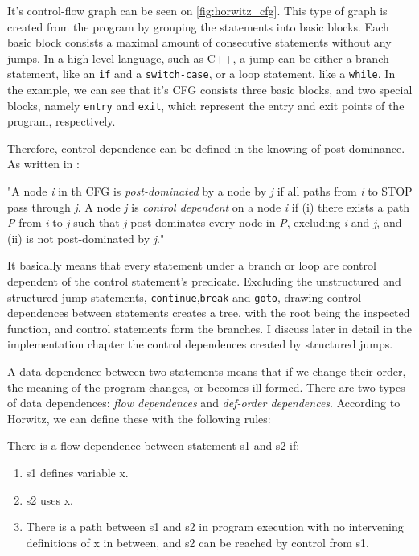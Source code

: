 \documentclass[oneside,12pt,a4paper]{book}
\begin{document}
It's control-flow graph can be seen on \ref{fig:horwitz_cfg}. This type of graph is created from the program by grouping the statements into basic blocks. Each basic block consists a maximal amount of consecutive statements without any jumps. In a high-level language, such as C++, a jump can be either a branch statement, like an \texttt{if} and a \texttt{switch-case}, or a loop statement, like a \texttt{while}. In the example, we can see that it's CFG consists three basic blocks, and two special blocks, namely \texttt{entry} and \texttt{exit}, which represent the entry and exit points of the program, respectively.

Therefore, control dependence can be defined in the knowing of post-dominance. As written in \cite{slicing-survey}:

"A node \textit{i} in th CFG is \textit{post-dominated} by a node by \textit{j} if all paths from \textit{i} to STOP pass through \textit{j}. A node \textit{j} is \textit{control dependent} on a node \textit{i} if (i) there exists a path \textit{P} from \textit{i} to \textit{j} such that \textit{j} post-dominates every node in \textit{P}, excluding \textit{i} and \textit{j}, and (ii) is not post-dominated by \textit{j}."

It basically means that every statement under a branch or loop are control dependent of the control statement's predicate. Excluding the unstructured and structured jump statements, \texttt{continue},\texttt{break} and \texttt{goto}, drawing control dependences between statements creates a tree, with the root being the inspected function, and control statements form the branches. I discuss later in detail in the implementation chapter the control dependences created by structured jumps. 

A data dependence between two statements means that if we change their order, the meaning of the program changes, or becomes ill-formed. There are two types of data dependences: \textit{flow dependences} and \textit{def-order dependences}. According to Horwitz\cite{horwitz-interproc}, we can define these with the following rules:

There is a flow dependence between statement s1 and s2 if:
\begin{enumerate}
  \item s1 defines variable x.
  \item s2 uses x.
  \item There is a path between s1 and s2 in program execution with no intervening definitions of x in between, and s2 can be reached by control from s1. 
\end{enumerate}
\end{document}
